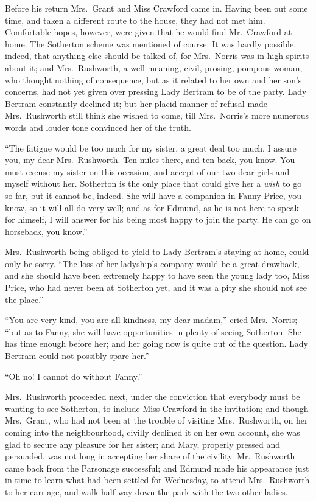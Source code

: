 \documentclass{article}
\begin{document}
Before his return Mrs.\ Grant and Miss Crawford came in.
Having been out some time, and taken a different route
to the house, they had not met him.  Comfortable hopes,
however, were given that he would find Mr.\ Crawford
at home.  The Sotherton scheme was mentioned of course.
It was hardly possible, indeed, that anything else should
be talked of, for Mrs.\ Norris was in high spirits about it;
and Mrs.\ Rushworth, a well-meaning, civil, prosing,
pompous woman, who thought nothing of consequence, but as it
related to her own and her son's concerns, had not yet
given over pressing Lady Bertram to be of the party.
Lady Bertram constantly declined it; but her placid manner
of refusal made Mrs.\ Rushworth still think she wished
to come, till Mrs.\ Norris's more numerous words and louder
tone convinced her of the truth.

``The fatigue would be too much for my sister, a great
deal too much, I assure you, my dear Mrs.\ Rushworth.
Ten miles there, and ten back, you know.  You must
excuse my sister on this occasion, and accept of our
two dear girls and myself without her.  Sotherton is
the only place that could give her a \emph{wish} to go so far,
but it cannot be, indeed.  She will have a companion
in Fanny Price, you know, so it will all do very well;
and as for Edmund, as he is not here to speak for himself,
I will answer for his being most happy to join the party.
He can go on horseback, you know.''

Mrs.\ Rushworth being obliged to yield to Lady Bertram's
staying at home, could only be sorry.  ``The loss of her
ladyship's company would be a great drawback, and she
should have been extremely happy to have seen the young
lady too, Miss Price, who had never been at Sotherton yet,
and it was a pity she should not see the place.''

``You are very kind, you are all kindness, my dear madam,''
cried Mrs.\ Norris; ``but as to Fanny, she will have
opportunities in plenty of seeing Sotherton.  She has
time enough before her; and her going now is quite out
of the question.  Lady Bertram could not possibly spare her.''

``Oh no!  I cannot do without Fanny.''

Mrs.\ Rushworth proceeded next, under the conviction that
everybody must be wanting to see Sotherton, to include
Miss Crawford in the invitation; and though Mrs.\ Grant,
who had not been at the trouble of visiting Mrs.\ Rushworth,
on her coming into the neighbourhood, civilly declined it
on her own account, she was glad to secure any pleasure
for her sister; and Mary, properly pressed and persuaded,
was not long in accepting her share of the civility.
Mr.\ Rushworth came back from the Parsonage successful;
and Edmund made his appearance just in time to learn what
had been settled for Wednesday, to attend Mrs.\ Rushworth
to her carriage, and walk half-way down the park with the two
other ladies.
\end{document}

